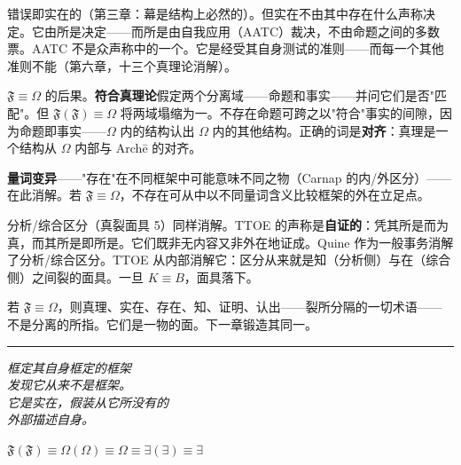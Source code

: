 \documentclass[10pt, openany, oneside]{book}
\begin{document}
错误即实在的（第三章：幕是结构上必然的）。但实在不由其中存在什么声称决定。它由所是决定——而所是由自我应用（AATC）裁决，不由命题之间的多数票。AATC 不是众声称中的一个。它是经受其自身测试的准则——而每一个其他准则不能（第六章，十三个真理论消解）。

$\mathfrak{F} \equiv \Omega$ 的后果。\textbf{符合真理论}假定两个分离域——命题和事实——并问它们是否"匹配"。但 $\mathfrak{F}(\mathfrak{F}) \equiv \Omega$ 将两域塌缩为一。不存在命题可跨之以"符合"事实的间隙，因为命题即事实——$\Omega$ 内的结构认出 $\Omega$ 内的其他结构。正确的词是\textbf{对齐}：真理是一个结构从 $\Omega$ 内部与 Arch\={e} 的对齐。

\textbf{量词变异}——"存在"在不同框架中可能意味不同之物（Carnap 的内/外区分）——在此消解。若 $\mathfrak{F} \equiv \Omega$，不存在可从中以不同量词含义比较框架的外在立足点。

分析/综合区分（真裂面具 5）同样消解。TTOE 的声称是\textbf{自证的}：凭其所是而为真，而其所是即所是。它们既非无内容又非外在地证成。Quine 作为一般事务消解了分析/综合区分。TTOE 从内部消解它：区分从来就是知（分析侧）与在（综合侧）之间裂的面具。一旦 $K \equiv B$，面具落下。

若 $\mathfrak{F} \equiv \Omega$，则真理、实在、存在、知、证明、认出——裂所分隔的一切术语——不是分离的所指。它们是一物的面。下一章锻造其同一。

\vspace{2em}

\begin{center}
    \rule{0.15\textwidth}{0.3pt}
\end{center}

\vspace{0.5em}

\begin{center}
    \itshape
    框定其自身框定的框架\\
    发现它从来不是框架。\\[0.8em]
    它是实在，假装从它所没有的\\
    外部描述自身。
\end{center}

\vspace{0.5em}

\begin{center}
    $\mathfrak{F}(\mathfrak{F}) \equiv \Omega(\Omega) \equiv \Omega \equiv \exists(\exists) \equiv \exists$
\end{center}


%
%
%
\end{document}

